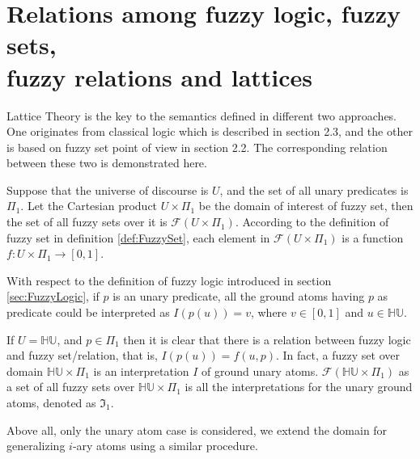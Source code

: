 \documentclass[Thesis.tex]{subfiles}
\begin{document}
\chapter{Relations among fuzzy logic, fuzzy sets,\\ fuzzy relations and lattices}
\label{chap:CorrespondingRelation}
Lattice Theory is the key to the semantics defined in different two approaches. One originates from classical logic which is described in section 2.3, and the other is based on fuzzy set point of view in section 2.2. The corresponding relation between these two is demonstrated  here.

Suppose that the universe of discourse is $U$, and the set of all unary predicates is $\Pi_1$. Let the Cartesian product $U \times \Pi_1$ be the domain of interest of fuzzy set, then the set of all fuzzy sets over it is $\mathcal{F}(U \times \Pi_1)$. According to the definition of fuzzy set in definition \ref{def:FuzzySet}, each element in $\mathcal{F}(U \times \Pi_1)$ is a function $f : U \times \Pi_1 \rightarrow [0,1]$. 

With respect to the definition of fuzzy logic introduced in section \ref{sec:FuzzyLogic}, if $p$ is an unary predicate, all the ground atoms having $p$ as predicate could be interpreted as $I(p(u))=v$, where $v \in [0,1]$ and $u \in \mathbb{HU}$.

If $U=\mathbb{HU}$, and $p \in \Pi_1$ then it is clear that there is a relation between fuzzy logic and fuzzy set/relation, that is, $I(p(u))=f(u,p)$. In fact, a fuzzy set over domain $\mathbb{HU} \times \Pi_1$ is an interpretation $I$ of ground unary atoms. $\mathcal{F}(\mathbb{HU} \times \Pi_1)$ as a set of all fuzzy sets over $\mathbb{HU} \times \Pi_1$ is all the interpretations for the unary ground atoms, denoted as $\mathfrak{I}_1$.

Above all, only the unary atom case is considered, we extend the domain for generalizing $i$-ary atoms using a similar procedure.
\end{document}
